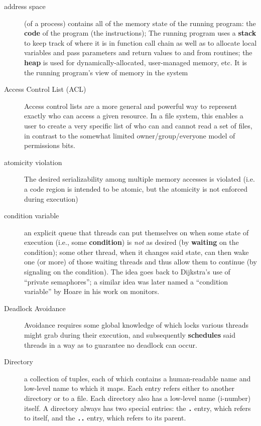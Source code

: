 \begin{description}
\item[address space] (of a process) contains all of the memory state of the
running program: the \textbf{code} of the program (the instructions); The running program uses a \textbf{stack} to keep track of where it is in function call chain as well as to allocate local variables and pass parameters and return values to and from routines; the \textbf{heap} is used for dynamically-allocated, user-managed memory, etc.  It is the running program’s view of memory in the system

\item[Access Control List (ACL)]  Access control lists are a more general and powerful way to represent exactly who can access a given resource. In a file system, this enables a user to create a very specific list of who can and cannot read a set of files, in contrast to the somewhat limited owner/group/everyone model of permissions bits.

\item[atomicity violation] The desired serializability among multiple memory accesses is violated (i.e. a code region is intended to be atomic, but the atomicity is not enforced during execution)


\item[condition variable] an explicit queue that threads can put themselves on when some state of execution (i.e., some \textbf{condition}) is \emph{not} as desired (by \textbf{waiting} on the condition); some other thread, when it changes said state, can then wake one (or more) of those waiting threads and thus allow them to continue (by signaling on the condition). The idea goes back to Dijkstra's use of ``private semaphores''; a similar idea was later named a ``condition variable'' by Hoare in his work on monitors.

\item[Deadlock Avoidance] Avoidance requires some global knowledge of which locks various threads might grab during their execution, and subsequently \textbf{schedules} said threads in a way as to guarantee no deadlock can occur.

\item[Directory] a collection of tuples, each of which contains a human-readable name and low-level name to which it maps. Each entry refers either to another directory or to a file. Each directory also has a low-level name (i-number) itself. A directory always has two special entries: the \textbf{\texttt{.}} entry, which refers to itself, and the \textbf{\texttt{..}} entry, which refers to its parent.


\end{description}

